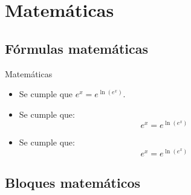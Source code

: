 \documentclass[10pt, envcountsect, presentation, aspectratio=43]{beamer}
\begin{document}
\section{Matemáticas}


\subsection{Fórmulas matemáticas}

\begin{frame}{Matemáticas}
\begin{itemize}
\item  Se cumple que $e^x=e^{\ln(e^x)}$.

\item  Se cumple que: $$e^x=e^{\ln(e^x)}$$

\item  Se cumple que: 
\begin{equation}
e^x=e^{\ln(e^x)}
\end{equation}

\end{itemize}
\end{frame}



\subsection{Bloques matemáticos}
\end{document}
